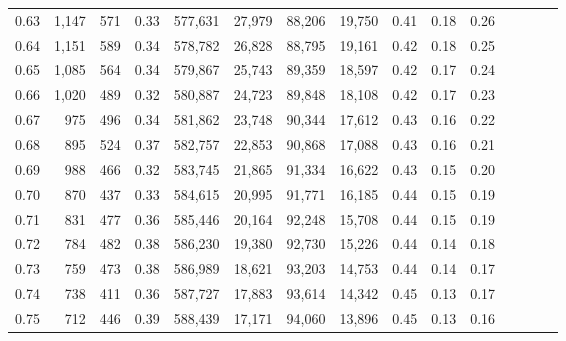 \begin{tabular}{rrrcrrrrrrrrrrr}
0.63 &   1,147 &    571 &                                       0.33 &  577,631 &   27,979 &   88,206 &   19,750 &  0.41 &  0.18 &                         0.26 \\
0.64 &   1,151 &    589 &                                       0.34 &  578,782 &   26,828 &   88,795 &   19,161 &  0.42 &  0.18 &                         0.25 \\
0.65 &   1,085 &    564 &                                       0.34 &  579,867 &   25,743 &   89,359 &   18,597 &  0.42 &  0.17 &                         0.24 \\
0.66 &   1,020 &    489 &                                       0.32 &  580,887 &   24,723 &   89,848 &   18,108 &  0.42 &  0.17 &                         0.23 \\
0.67 &     975 &    496 &                                       0.34 &  581,862 &   23,748 &   90,344 &   17,612 &  0.43 &  0.16 &                         0.22 \\
0.68 &     895 &    524 &                                       0.37 &  582,757 &   22,853 &   90,868 &   17,088 &  0.43 &  0.16 &                         0.21 \\
0.69 &     988 &    466 &                                       0.32 &  583,745 &   21,865 &   91,334 &   16,622 &  0.43 &  0.15 &                         0.20 \\
0.70 &     870 &    437 &                                       0.33 &  584,615 &   20,995 &   91,771 &   16,185 &  0.44 &  0.15 &                         0.19 \\
0.71 &     831 &    477 &                                       0.36 &  585,446 &   20,164 &   92,248 &   15,708 &  0.44 &  0.15 &                         0.19 \\
0.72 &     784 &    482 &                                       0.38 &  586,230 &   19,380 &   92,730 &   15,226 &  0.44 &  0.14 &                         0.18 \\
0.73 &     759 &    473 &                                       0.38 &  586,989 &   18,621 &   93,203 &   14,753 &  0.44 &  0.14 &                         0.17 \\
0.74 &     738 &    411 &                                       0.36 &  587,727 &   17,883 &   93,614 &   14,342 &  0.45 &  0.13 &                         0.17 \\
0.75 &     712 &    446 &                                       0.39 &  588,439 &   17,171 &   94,060 &   13,896 &  0.45 &  0.13 &                         0.16 \\

\end{tabular}
